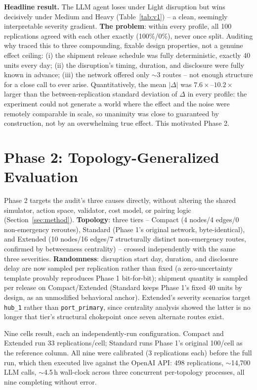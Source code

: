 \documentclass[10pt,twocolumn]{article}
\begin{document}
\textbf{Headline result.} The LLM agent loses under Light disruption but wins decisively under Medium and Heavy (Table~\ref{tab:v1}) -- a clean, seemingly interpretable severity gradient. \textbf{The problem}: within every profile, all 100 replications agreed with each other exactly (100\%/0\%), never once split. Auditing why traced this to three compounding, fixable design properties, not a genuine effect ceiling: (i) the shipment release schedule was fully deterministic, exactly 40 units every day; (ii) the disruption's timing, duration, and disclosure were fully known in advance; (iii) the network offered only $\sim$3 routes -- not enough structure for a close call to ever arise. Quantitatively, the mean $|\Delta|$ was $7.6\times$--$10.2\times$ larger than the between-replication standard deviation of $\Delta$ in every profile: the experiment could not generate a world where the effect and the noise were remotely comparable in scale, so unanimity was close to guaranteed by construction, not by an overwhelming true effect. This motivated Phase 2.

\section{Phase 2: Topology-Generalized Evaluation}
\label{sec:phase2}
Phase 2 targets the audit's three causes directly, without altering the shared simulator, action space, validator, cost model, or pairing logic (Section~\ref{sec:method}). \textbf{Topology}: three tiers -- Compact (4 nodes/4 edges/0 non-emergency reroutes), Standard (Phase 1's original network, byte-identical), and Extended (10 nodes/16 edges/7 structurally distinct non-emergency routes, confirmed by betweenness centrality) -- crossed independently with the same three severities. \textbf{Randomness}: disruption start day, duration, and disclosure delay are now sampled per replication rather than fixed (a zero-uncertainty template provably reproduces Phase 1 bit-for-bit); shipment quantity is sampled per release on Compact/Extended (Standard keeps Phase 1's fixed 40 units by design, as an unmodified behavioral anchor). Extended's severity scenarios target \texttt{hub\_1} rather than \texttt{port\_primary}, since centrality analysis showed the latter is no longer that tier's structural chokepoint once seven alternate routes exist.

Nine cells result, each an independently-run configuration. Compact and Extended run 33 replications/cell; Standard runs Phase 1's original 100/cell as the reference column. All nine were calibrated (3 replications each) before the full run, which then executed live against the OpenAI API: 498 replications, $\sim$14{,}700 LLM calls, $\sim$4.5\,h wall-clock across three concurrent per-topology processes, all nine completing without error.
\end{document}

